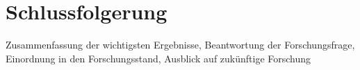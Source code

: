 \chapter{Schlussfolgerung}

Zusammenfassung der wichtigsten Ergebnisse, Beantwortung der Forschungsfrage, Einordnung in den Forschungsstand, Ausblick auf zukünftige Forschung
